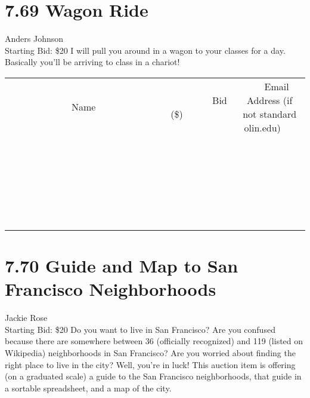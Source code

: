 \documentclass[11pt]{article}
\begin{document}
\section*{7.69 Wagon Ride}
Anders Johnson
\\
Starting Bid: \$20
\newline
I will pull you around in a wagon to your classes for a day.  Basically you'll be arriving to class in a chariot!
\\[6ex]
\begin{tabular}{c c c}
~~~~~~~~~~~~~Name~~~~~~~~~~~~~ & ~~~~~~~~~Bid (\$)~~~~~~~~~  & ~~~Email Address (if not standard olin.edu)~~~\\
 & & \\
\hline
 & & \\
\hline
 & & \\
\hline
 & & \\
\hline
 & & \\
\hline
 & & \\
\hline
 & & \\
\hline
 & & \\
\hline
 & & \\
\hline
 & & \\
\hline
 & & \\
\hline
 & & \\
\hline
 & & \\
\hline
 & & \\
\hline
 & & \\
\hline
 & & \\
\hline
 & & \\
\hline
 & & \\
\hline
 & & \\
\hline
 & & \\
\hline
 & & \\
\hline
 & & \\
\hline
 & & \\
\hline
 & & \\
\hline
 & & \\
\hline
 & & \\
\hline
\end{tabular}
\newpage
\section*{7.70 Guide and Map to San Francisco Neighborhoods}
Jackie Rose
\\
Starting Bid: \$20
\newline
Do you want to live in San Francisco? Are you confused because there are somewhere between 36 (officially recognized) and 119 (listed on Wikipedia) neighborhoods in San Francisco? Are you worried about finding the right place to live in the city? Well, you're in luck! This auction item is offering (on a graduated scale) a guide to the San Francisco neighborhoods, that guide in a sortable spreadsheet, and a map of the city.
\end{document}
